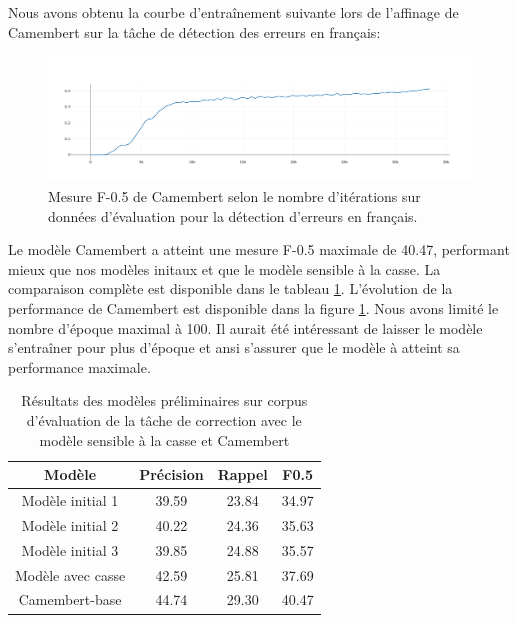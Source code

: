 \documentclass[12pt,twoside,maitrise]{dms}
\theoremstyle{definition}
\numberwithin{equation}{section}
\numberwithin{table}{chapter}
\numberwithin{figure}{chapter}
\begin{document}
Nous avons obtenu la courbe d'entraînement suivante lors de l'affinage de
Camembert sur la tâche de détection des erreurs en français:

\begin{figure}
	\begin{center}
		\includegraphics[width=1.0\textwidth]{figures/camembertbasef05100epoquesnat.png}
	\end{center}
	\caption{Mesure F-0.5 de Camembert selon le nombre d'itérations sur
		données d'évaluation pour la détection d'erreurs en
		français.}\label{fig:f05camembert}
\end{figure}
Le modèle Camembert a atteint une mesure F-0.5 maximale de 40.47, performant
mieux que nos modèles initaux et que le modèle sensible à la casse. La
comparaison complète est disponible dans le tableau
\ref{table:perf_initiaux_camembert}. L'évolution de la performance de Camembert
est disponible dans la figure \ref{fig:f05camembert}. Nous avons limité le
nombre d'époque maximal à 100. Il aurait été intéressant de laisser le modèle
s'entraîner pour plus d'époque et ansi s'assurer que le modèle à atteint sa
performance maximale.

\begin{table}
	\centering
	\begin{tabular}{||c | c | c | c||}
		\hline
		Modèle            & Précision & Rappel & F0.5  \\ [0.5ex]
		\hline\hline
		Modèle initial 1  & 39.59     & 23.84  & 34.97 \\
		Modèle initial 2  & 40.22     & 24.36  & 35.63 \\
		Modèle initial 3  & 39.85     & 24.88  & 35.57 \\
		Modèle avec casse & 42.59     & 25.81  & 37.69 \\
		Camembert-base    & 44.74     & 29.30  & 40.47 \\
		\hline
	\end{tabular}
	\caption{Résultats des modèles préliminaires sur corpus d'évaluation de la tâche de correction avec le modèle sensible à la casse et Camembert}
	\label{table:perf_initiaux_camembert}
\end{table}
\end{document}
